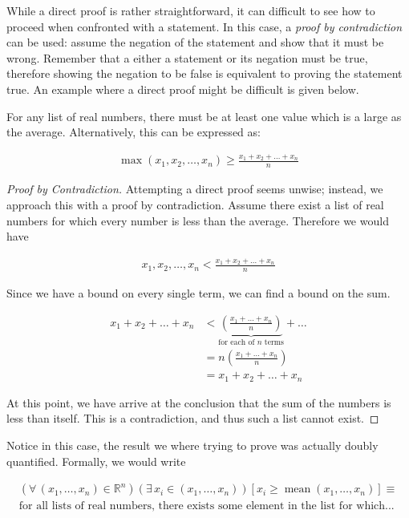 \documentclass{report}
\DeclareMathOperator{\mean}{mean}
\begin{document}
While a direct proof is rather straightforward, it can difficult to see how to proceed when confronted with a statement. In this case, a \emph{proof by contradiction} can be used: assume the negation of the statement and show that it must be wrong. Remember that a either a statement or its negation must be true, therefore showing the negation to be false is equivalent to proving the statement true. An example where a direct proof might be difficult is given below.

\vspace{\baselineskip}
\begin{theorem}
	For any list of real numbers, there must be at least one value which is a large as the average. Alternatively, this can be expressed as:
	
	\begin{align}
		\max(x_1, x_2, \dots, x_n) \ge \frac{x_1 + x_2 + \dots + x_n}{n}
	\end{align}
\end{theorem}

\begin{proof}[Proof by Contradiction]
	Attempting a direct proof seems unwise; instead, we approach this with a proof by contradiction. Assume there exist a list of real numbers for which every number is less than the average. Therefore we would have
	
	\begin{align*}
		x_1, x_2, \dots, x_n < \frac{x_1 + x_2 + \dots + x_n}{n}
	\end{align*} 
	
	Since we have a bound on every single term, we can find a bound on the sum.
	
	\begin{align*}
		x_1 + x_2 + \dots + x_n &< \underbrace{\left( \frac{x_1 + \dots + x_n}{n} \right)}_\text{for each of $n$ terms} + \dots \\
		&= n \left( \frac{x_1 + \dots + x_n}{n} \right) \\
		&= x_1 + x_2 + \dots + x_n
	\end{align*}
	
	At this point, we have arrive at the conclusion that the sum of the numbers is less than itself. This is a contradiction, and thus such a list cannot exist.
\end{proof}

Notice in this case, the result we where trying to prove was actually doubly quantified. Formally, we would write

\begin{align*}
	(\forall \, (x_1, \dots, x_n) \in \mathbb{R}^n)(\exists \, x_i \in (x_1, \dots, x_n))[x_i \ge \mean(x_1, \dots, x_n)] \equiv \\
	\text{for all lists of real numbers, there exists some element in the list for which...}
\end{align*}
\end{document}
